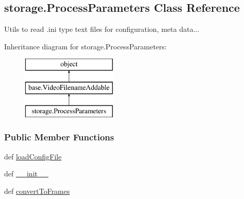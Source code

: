 \hypertarget{classstorage_1_1ProcessParameters}{\subsection{storage.\-Process\-Parameters Class Reference}
\label{classstorage_1_1ProcessParameters}
}


Utils to read .ini type text files for configuration, meta data...  


Inheritance diagram for storage.\-Process\-Parameters\-:\begin{figure}[H]
\begin{center}
\leavevmode
\includegraphics[height=3.000000cm]{classstorage_1_1ProcessParameters}
\end{center}
\end{figure}
\subsubsection*{Public Member Functions}
\begin{DoxyCompactItemize}
\item 
def \hyperlink{classstorage_1_1ProcessParameters_ae5638fb6be16b5c2a02311817d8a1362}{load\-Config\-File}
\item 
def \hyperlink{classstorage_1_1ProcessParameters_a3a5510c748699d3247288e473ee844b8}{\-\_\-\-\_\-init\-\_\-\-\_\-}
\item 
def \hyperlink{classstorage_1_1ProcessParameters_a48ee592e21e7aec5028d192085c59010}{convert\-To\-Frames}
\end{DoxyCompactItemize}
